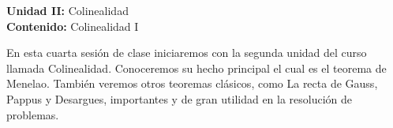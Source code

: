 {\Large
    \textbf{Unidad II:} Colinealidad\vspace{2mm}\\
    \textbf{Contenido:} Colinealidad I
}

En esta cuarta sesión de clase iniciaremos con la segunda unidad del curso llamada Colinealidad.
Conoceremos su hecho principal el cual es el teorema de Menelao.
También veremos otros teoremas clásicos, como La recta de Gauss, Pappus y Desargues, importantes y de gran utilidad en la resolución de problemas.